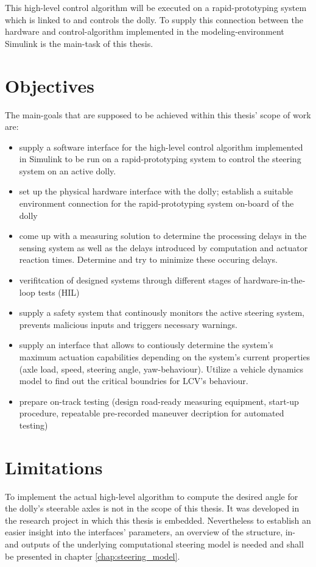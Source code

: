 \documentclass[ExampleMasters.tex]{subfiles}
\begin{document}
This high-level control algorithm will be executed on a rapid-prototyping system which is linked to and controls the dolly. To supply this connection between the hardware and control-algorithm implemented in the modeling-environment Simulink is the main-task of this thesis.    

\section{Objectives}
\label{sec:objectives}
The main-goals that are supposed to be achieved within this thesis' scope of work are: 

\begin{itemize}
	\item{supply a software interface for the high-level control algorithm implemented in Simulink to be run on a rapid-prototyping system to control the steering system on an active dolly. }
	\item{set up the physical hardware interface with the dolly; establish a suitable environment connection for the rapid-prototyping system on-board of the dolly} 
	\item{come up with a measuring solution to determine the processing delays in the sensing system as well as the delays introduced by computation and actuator reaction times. Determine and try to minimize these occuring delays.}  
	\item{verifitcation of designed systems through different stages of hardware-in-the-loop tests (HIL)}
	\item{supply a safety system that continously monitors the active steering system, prevents malicious inputs and triggers necessary warnings.}
	\item{supply an interface that allows to contiously determine the system's maximum actuation capabilities depending on the system's current properties (axle load, speed, steering angle, yaw-behaviour). Utilize a vehicle dynamics model to find out the critical boundries for LCV's behaviour.}	
	\item{prepare on-track testing (design road-ready measuring equipment, start-up procedure, repeatable pre-recorded maneuver decription for automated testing)}
	
\end{itemize}



\section{Limitations}
\label{sec:limitations}
To implement the actual high-level algorithm to compute the desired angle for the dolly's steerable axles is not in the scope of this thesis. It was developed in the research project in which this thesis is embedded. Nevertheless to establish an easier insight into the interfaces' parameters, an overview of the structure, in- and outputs of the underlying computational steering model is needed and shall be presented in chapter \ref{chap:steering_model}. 
\end{document}
